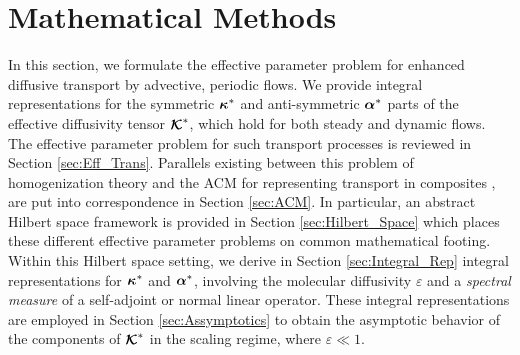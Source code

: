 \documentclass[11pt]{amsart}
\newcommand\Kbc{\mbox{\boldmath${\mathcal{K}}$}}
\newcommand\balpha{\mbox{\boldmath${\alpha}$}}
\newcommand\bkappa{\mbox{\boldmath${\kappa}$}}
\begin{document}
\section{Mathematical Methods}\label{sec:Mathematical_Methods} 
%
In this section, we formulate the effective parameter problem for
enhanced diffusive transport by advective, periodic flows. We provide
integral representations for the symmetric $\bkappa^*$ and
anti-symmetric $\balpha^*$ parts of the effective diffusivity tensor 
$\Kbc^*$, which hold for both steady and dynamic flows. The effective
parameter problem
\cite{McLaughlin:SIAM_JAM:780,Fannjiang:SIAM_JAM:333,Biferale:PF:2725}
for such transport processes  is reviewed in Section
\ref{sec:Eff_Trans}. Parallels existing between this problem of
homogenization theory \cite{Bensoussan:Book:1978} and the ACM for
representing transport in composites \cite{Golden:CMP-473}, are put
into correspondence in Section \ref{sec:ACM}. In particular, an
abstract Hilbert space framework is provided in Section 
\ref{sec:Hilbert_Space} which places these different effective
parameter problems on common mathematical footing. Within this Hilbert
space setting, we derive in Section \ref{sec:Integral_Rep} integral
representations for $\bkappa^*$ and $\balpha^*$, involving the
molecular diffusivity $\varepsilon$ and a \emph{spectral measure} of a
self-adjoint or normal linear operator. These integral representations
are employed in Section \ref{sec:Assymptotics} to obtain the asymptotic
behavior of the components of $\Kbc^*$ in the scaling regime, where
$\varepsilon\ll1$.  
\end{document}
